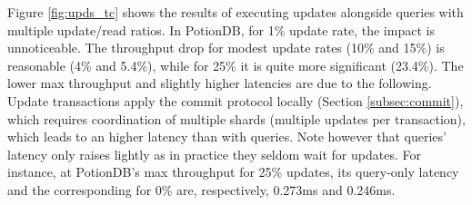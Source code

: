 \documentclass[sigconf, nonacm]{acmart}
\begin{document}

Figure \ref{fig:upds_tc} shows the results of executing updates alongside queries with multiple update/read ratios.
In PotionDB, for 1\% update rate, the impact is unnoticeable.
The throughput drop for modest update rates (10\% and 15\%) is reasonable (4\% and 5.4\%), while for 25\% it is quite more significant (23.4\%).
The lower max throughput and slightly higher latencies are due to the following.
Update transactions apply the commit protocol locally (Section \ref{subsec:commit}), which requires coordination of multiple shards (multiple updates per transaction), which leads to an higher latency than with queries.
Note however that queries' latency only raises lightly as in practice they seldom wait for updates.
For instance, at PotionDB's max throughput for 25\% updates, its query-only latency and the corresponding for 0\% are, respectively, 0.273ms and 0.246ms.

\end{document}
